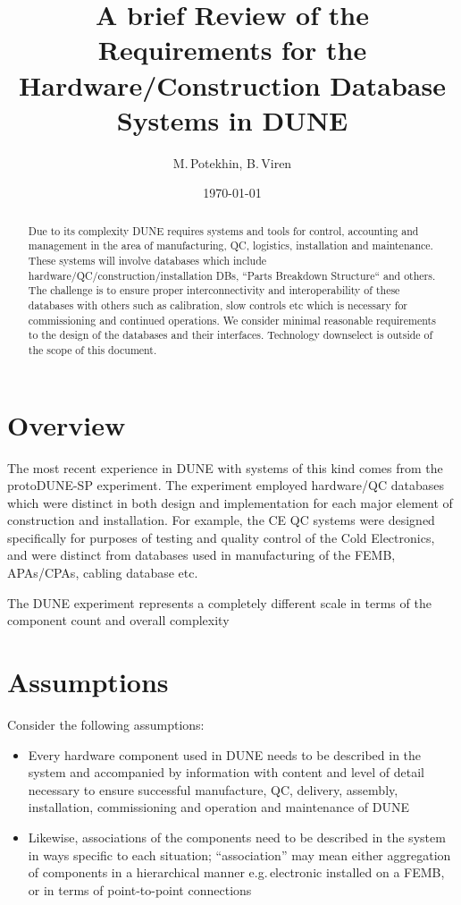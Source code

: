 \documentclass[pdftex,12pt,letter]{article}
\title{A brief Review of the Requirements for the Hardware/Construction Database Systems in DUNE}
\date{\today}
\author{M.\,Potekhin, B.\,Viren}
\begin{document}
\maketitle

\begin{abstract}
\noindent  Due to its complexity DUNE requires systems and tools for control, accounting and
management in the area of manufacturing, QC, logistics, installation and maintenance. These systems
will involve databases which include hardware/QC/construction/installation DBs,
``Parts Breakdown Structure`` and others. The challenge is to ensure proper
interconnectivity and interoperability of these databases with others such as calibration,
slow controls etc which is necessary for commissioning and continued
operations. We consider minimal reasonable requirements to the design of the databases
and their interfaces. Technology downselect is outside of the scope of this document.

\end{abstract}


\section{Overview}

The most recent experience in DUNE with systems of this kind comes from the protoDUNE-SP experiment.
The experiment employed hardware/QC databases which were distinct in both
design and implementation for each major element of construction and installation. For example, the CE QC
systems were designed specifically for purposes of testing and quality control of the Cold Electronics,
and were distinct from databases used in manufacturing of the FEMB, APAs/CPAs, cabling database etc.

The DUNE experiment represents a completely different scale in terms of the component count and
overall complexity

\section{Assumptions}

Consider the following assumptions:

\begin{itemize}

\item Every hardware component used in DUNE needs to be described in the
system and accompanied by information with content and level of detail necessary to ensure
successful manufacture, QC, delivery, assembly, installation, commissioning and operation and maintenance of
DUNE

\item Likewise, associations of the components need to be described in the system
in ways specific to each situation; ``association'' may mean either aggregation of components
in a hierarchical manner e.g.\,electronic installed on a FEMB, or in terms of point-to-point connections

\end{itemize}
\end{document}
